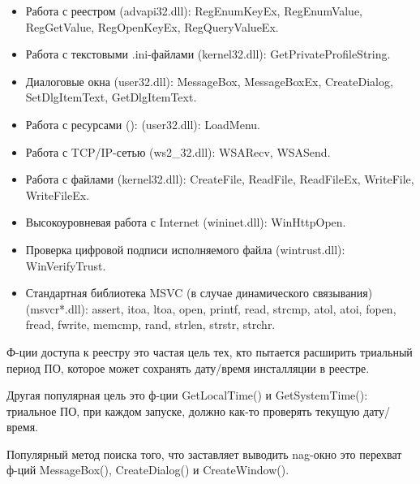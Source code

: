 \begin{itemize}

\item
Работа с реестром (advapi32.dll): 
RegEnumKeyEx, RegEnumValue, RegGetValue, RegOpenKeyEx, RegQueryValueEx.

\item
Работа с текстовыми .ini-файлами (kernel32.dll): 
GetPrivateProfileString.

\item
Диалоговые окна (user32.dll): 
MessageBox, MessageBoxEx, CreateDialog, SetDlgItemText, GetDlgItemText.

\item
Работа с ресурсами (): (user32.dll):
LoadMenu.

\item
Работа с TCP/IP-сетью (ws2\_32.dll):
WSARecv, WSASend.

\item
Работа с файлами (kernel32.dll):
CreateFile, ReadFile, ReadFileEx, WriteFile, WriteFileEx.

\item
Высокоуровневая работа с Internet
(wininet.dll):
WinHttpOpen.

\item
Проверка цифровой подписи исполняемого файла (wintrust.dll):
WinVerifyTrust.

\item
Стандартная библиотека MSVC (в случае динамического связывания)%
 (msvcr*.dll):
assert, itoa, ltoa, open, printf, read, strcmp, atol, atoi, fopen, fread, fwrite, memcmp, rand,
strlen, strstr, strchr.

\end{itemize}


Ф-ции доступа к реестру это частая цель тех, кто пытается расширить триальный период ПО, которое
может сохранять дату/время инсталляции в реестре.

Другая популярная цель это ф-ции GetLocalTime() и GetSystemTime():
триальное ПО, при каждом запуске, должно как-то проверять текущую дату/время.


Популярный метод поиска того, что заставляет выводить nag-окно это перехват ф-ций MessageBox(),
CreateDialog() и CreateWindow().


